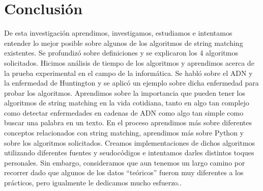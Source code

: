 \section*{Conclusión}
\quad De esta investigación aprendimos, investigamos, estudiamos e intentamos entender lo mejor posible sobre algunos de los algoritmos de string matching existentes. Se profundizó sobre definiciones y se explicaron los 4 algoritmos solicitados. Hicimos análisis de tiempo de los algoritmos y aprendimos acerca de la prueba experimental en el campo de la informática. Se habló sobre el ADN y la enfermedad de Huntington y se aplicó un ejemplo sobre dicha enfermedad para probar los algoritmos. Aprendimos sobre la importancia que pueden tener los algoritmos de string matching en la vida cotidiana, tanto en algo tan complejo como detectar enfermedades en cadenas de ADN como algo tan simple como buscar una palabra en un texto. En el proceso aprendimos más sobre diferentes conceptos relacionados con string matching, aprendimos más sobre Python y sobre los algoritmos solicitados. Creamos implementaciones de dichos algoritmos utilizando diferentes fuentes y seudocódigos e intentamos darles distintos toques personales. Sin embargo, consideramos que aun tenemos un largo camino por recorrer dado que algunos de los datos “teóricos” fueron muy diferentes a los prácticos, pero igualmente le dedicamos mucho esfuerzo..